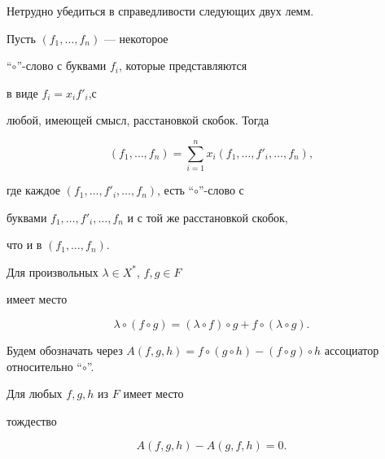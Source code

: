 Нетрудно убедиться в справедливости следующих двух лемм.





\begin{lem} Пусть $(f_1,\dotsc ,f_n)$ --- некоторое


``$\circ $''-слово с буквами $f_i$, которые представляются


в виде $f_i=x_if'_i$,с


любой, имеющей смысл, расстановкой скобок. Тогда


\begin{equation}\label{5}


(f_1,\dotsc ,f_n) = \sum_{i=1}^{n} x_i(f_1,\dotsc ,f'_i,\dotsc ,f_n),


\end{equation}


где каждое $(f_1,\dotsc ,f'_i,\dotsc ,f_n)$, есть ``$\circ $''-слово с


буквами $f_1,\dotsc ,f'_i,\dotsc ,f_n$ и с той же расстановкой скобок,


что и в $(f_1,\dotsc ,f_n)$.


\end{lem}





\begin{lem} Для произвольных $\lambda \in X^*$, $f, g \in F$


имеет место


\begin{equation}\label{6}


\lambda \circ (f \circ g)=(\lambda \circ f) \circ g +


f \circ (\lambda \circ g).


\end{equation}


\end{lem}





Будем обозначать через $A(f,g,h)=f \circ (g \circ h)-


(f \circ g) \circ h$ ассоциатор относительно ``$\circ$''.





\begin{lem} Для любых $f, g, h$ из $F$ имеет место


тождество


\begin{equation}\label{7}


A(f,g,h)-A(g,f,h) = 0.


\end{equation}


\end{lem}





